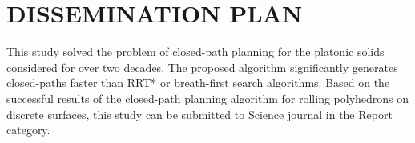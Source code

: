 \section{DISSEMINATION PLAN}
\noindent This study solved the problem of closed-path planning for the platonic solids considered for over two decades. The proposed algorithm significantly generates closed-paths faster than RRT* or breath-first search algorithms.
Based on the successful results of the closed-path planning algorithm for rolling polyhedrons on discrete surfaces, this study can be submitted to Science journal in the Report category. 





















